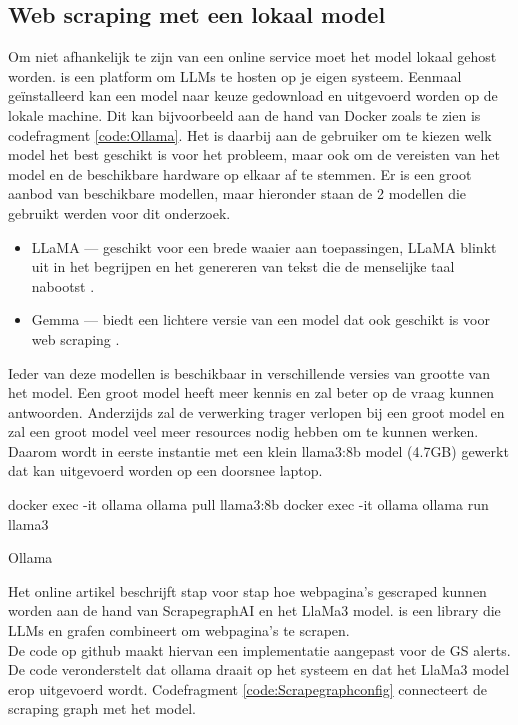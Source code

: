 \subsection{Web scraping met een lokaal model}
Om niet afhankelijk te zijn van een online service moet het model lokaal gehost worden. \textcite{Ollama2025} is een platform om LLMs te hosten op je eigen systeem. Eenmaal geïnstalleerd kan een model naar keuze gedownload en uitgevoerd worden op de lokale machine.
Dit kan bijvoorbeeld aan de hand van Docker zoals te zien is codefragment \ref{code:Ollama}. Het is daarbij aan de gebruiker om te kiezen welk model het best geschikt is voor het probleem, maar ook om de vereisten van het model en de beschikbare hardware op elkaar af te stemmen. Er is een groot aanbod van beschikbare modellen, maar hieronder staan de 2 modellen die gebruikt werden voor dit onderzoek.
\begin{itemize}
    \item LLaMA — geschikt voor een brede waaier aan toepassingen, LLaMA blinkt uit in het begrijpen en het genereren van tekst die de menselijke taal nabootst \autocite{Llama32025}.
    \item Gemma — biedt een lichtere versie van een model dat ook geschikt is voor web scraping \autocite{Gemma32025}.
\end{itemize}
Ieder van deze modellen is beschikbaar in verschillende versies van grootte van het model. Een groot model heeft meer kennis en zal beter op de vraag kunnen antwoorden. Anderzijds zal de verwerking trager verlopen bij een groot model en zal een groot model veel meer resources nodig hebben om te kunnen werken.
Daarom wordt in eerste instantie met een klein llama3:8b model (4.7GB) gewerkt dat kan uitgevoerd worden op een doorsnee laptop.
\begin{listing}
    docker exec -it ollama ollama pull llama3:8b
    docker exec -it ollama ollama run llama3
    \caption[Ollama]{Ollama}
    \label{code:Ollama}
\end{listing}
Het online artikel \textcite{Scrapegraphaillama2025} beschrijft stap voor stap hoe webpagina's gescraped kunnen worden aan de hand van ScrapegraphAI en het LlaMa3 model.
\textcite{ScrapeGraphAI2025} is een library die LLMs en grafen combineert om webpagina's te scrapen.\\
De code op github \textcite{Depaepeollama2025} maakt hiervan een implementatie aangepast voor de GS alerts. De code veronderstelt dat ollama draait op het systeem en dat het LlaMa3 model erop uitgevoerd wordt.
Codefragment \ref{code:Scrapegraphconfig} connecteert de scraping graph met het model.
